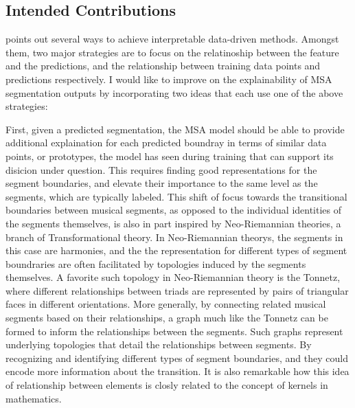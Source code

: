 \subsection{Intended Contributions}
\cite{molnar2019} points out several ways to achieve interpretable data-driven methods.
Amongst them, two major strategies are to focus on the relatinoship between the feature and the predictions, and the relationship between training data points and predictions respectively.
I would like to improve on the explainability of MSA segmentation outputs by incorporating two ideas that each use one of the above strategies:

First, given a predicted segmentation, the MSA model should be able to provide additional explaination for each predicted boundray in terms of similar data points, or prototypes, the model has seen during training that can support its disicion under question.
This requires finding good representations for the segment boundaries, and elevate their importance to the same level as the segments, which are typically labeled.
This shift of focus towards the transitional boundaries between musical segments, as opposed to the individual identities of the segments themselves, is also in part inspired by Neo-Riemannian theories, a branch of Transformational theory.
In Neo-Riemannian theorys, the segments in this case are harmonies, and the the representation for different types of segment boundraries are often facilitated by topologies induced by the segments themselves.
A favorite such topology in Neo-Riemannian theory is the Tonnetz, where different relationships between triads are represented by pairs of triangular faces in different orientations. 
More generally, by connecting related musical segments based on their relationships, a graph much like the Tonnetz can be formed to inform the relationships between the segments. 
Such graphs represent underlying topologies that detail the relationships between segments. 
By recognizing and identifying different types of segment boundaries, and they could encode more information about the transition.
It is also remarkable how this idea of relationship between elements is closly related to the concept of kernels in mathematics.

